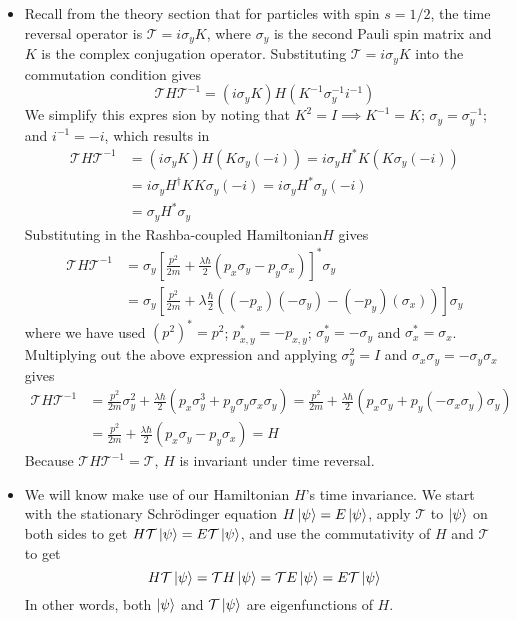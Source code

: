 \documentclass[11pt, a4paper]{article}
\newcommand{\Schro}{Schr\"{o}dinger\xspace}
\newcommand{\Ham}{Hamiltonian\xspace}
\newcommand{\T}{\mathcal{T}}  %
\begin{document}
\begin{itemize}
	\item Recall from the theory section that for particles with spin $ s = 1/2 $, the time reversal operator is $ \T = i \sigma_{y} K $, where $ \sigma_{y} $ is the second Pauli spin matrix and $ K $ is the complex conjugation operator. Substituting $ \T = i \sigma_{y} K $ into the commutation condition gives
	\begin{equation*}
		\T H \T^{-1} = (i\sigma_{y}K)H(K^{-1}\sigma_{y}^{-1}i^{-1})
	\end{equation*}
	We simplify this expres sion by noting that $ K^{2} = I \implies K^{-1} = K$;  $ \sigma_{y} = \sigma_{y}^{-1} $; and $ i^{-1} = -i $, which results in
	\begin{align*}
		\T H \T^{-1} &= (i\sigma_{y}K)H(K\sigma_{y}(-i)) = i \sigma_{y} H^{*} K (K\sigma_{y}(-i)) \\
		&= i \sigma_{y} H^{\dagger} KK \sigma_{y}(-i) = i \sigma_{y}H^{*}\sigma_{y}(-i) \\
		&= \sigma_{y}H^{*} \sigma_{y}
	\end{align*} 
	Substituting in the Rashba-coupled \Ham $ H $ gives
	\begin{align*}
		\T H\T^{-1} &= \sigma_{y} \left[\frac{p^{2}}{2m} + \frac{\lambda\hbar}{2} (p_{x}\sigma_{y} - p_{y}\sigma_{x})\right]^{*}\sigma_{y} \\
		& = \sigma_{y}\left[\frac{p^{2}}{2m} + \lambda \frac{\hbar}{2}\left((-p_{x})(-\sigma_{y}) - (-p_{y})(\sigma_{x}) \right)\right]\sigma_{y}
	\end{align*}
	where we have used $ (p^{2})^{*} = p^{2} $; $ p_{x,y}^{*} = -p_{x,y} $; $ \sigma_{y}^{*} = -\sigma_{y} $ and $ \sigma_{x}^{*} = \sigma_{x} $. Multiplying out the above expression and applying $ \sigma_{y}^{2} = I $ and $ \sigma_{x}\sigma_{y} = -\sigma_{y}\sigma_{x} $ gives
	\begin{align*}
		\T H\T^{-1} & = \frac{p^{2}}{2m}\sigma_{y}^{2} + \frac{\lambda\hbar}{2}\left(p_{x}\sigma_{y}^{3} + p_{y}\sigma_{y}\sigma_{x}\sigma_{y}\right) = \frac{p^{2}}{2m} + \frac{\lambda\hbar}{2}\left(p_{x}\sigma_{y} + p_{y}(-\sigma_{x}\sigma_{y})\sigma_{y}\right)\\
		&= \frac{p^{2}}{2m} + \frac{\lambda\hbar}{2} \left(p_{x}\sigma_{y} - p_{y}\sigma_{x}\right) = H
	\end{align*}
	Because $ \T H\T^{-1} = \T$, $ H $ is invariant under time reversal.
	
	\item We will know make use of our Hamiltonian $ H $'s time invariance. We start with the stationary \Schro equation $ H \ket{\psi} = E \ket{\psi} $, apply $ \T $ to $ \ket{\psi} $ on both sides to get  $ H \T\ket{\psi} = E \T\ket{\psi} $, and use the commutativity of $ H $ and $ \T $ to get
	\begin{equation*}
		H \T \ket{\psi} = \T H \ket{\psi} = \T E \ket{\psi} = E \T \ket{\psi}
	\end{equation*}
	In other words, both $ \ket{\psi} $ and $ \T\ket{\psi} $ are eigenfunctions of $ H $. 
	

\end{itemize}
\end{document}
